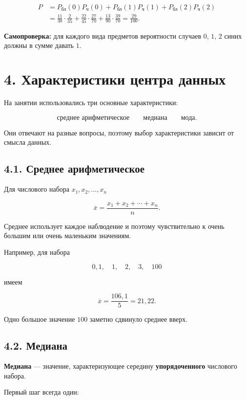 \documentclass[a4paper,12pt]{article}
\newcommand{\key}[1]{\textcolor{darkaccent}{\textbf{#1}}}
\begin{document}
\[
\begin{aligned}
P
&=
P_{\text{бл}}(0)P_{\text{ч}}(0)
+P_{\text{бл}}(1)P_{\text{ч}}(1)
+P_{\text{бл}}(2)P_{\text{ч}}(2)\\
&=
\frac{11}{30}\cdot\frac{2}{35}
+
\frac{22}{45}\cdot\frac{27}{70}
+
\frac{13}{90}\cdot\frac{39}{70}
=
\frac{29}{100}.
\end{aligned}
\]

\key{Самопроверка:} для каждого вида предметов вероятности случаев $0$, $1$, $2$ синих должны в сумме давать $1$.

\section*{4. Характеристики центра данных}

На занятии использовались три основные характеристики:

\[
\boxed{\text{среднее арифметическое}}
\qquad
\boxed{\text{медиана}}
\qquad
\boxed{\text{мода}}.
\]

Они отвечают на разные вопросы, поэтому выбор характеристики зависит от смысла данных.

\subsection*{4.1. Среднее арифметическое}

Для числового набора $x_1,x_2,\ldots,x_n$

\[
\overline{x}
=
\frac{x_1+x_2+\cdots+x_n}{n}.
\]

Среднее использует каждое наблюдение и поэтому чувствительно к очень большим или очень маленьким значениям.

Например, для набора

\[
0{,}1,\quad 1,\quad 2,\quad 3,\quad 100
\]

имеем

\[
\overline{x}
=
\frac{106{,}1}{5}
=
21{,}22.
\]

Одно большое значение $100$ заметно сдвинуло среднее вверх.

\subsection*{4.2. Медиана}

\key{Медиана} --- значение, характеризующее середину \textbf{упорядоченного} числового набора.

Первый шаг всегда один:
\end{document}
